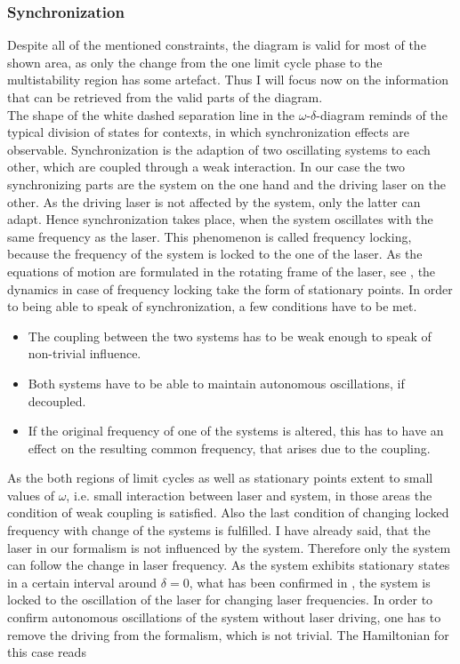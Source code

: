 \subsubsection{Synchronization}\label{sec:synchronization}
Despite all of the mentioned constraints, the diagram is valid for most of the shown area, as only the change from the one limit cycle phase to the multistability region has some artefact. Thus I will focus now on the information that can be retrieved from the valid parts of the diagram.\\%
The shape of the white dashed separation line in the $\omega$-$\delta$-diagram reminds of the typical division of states for contexts, in which synchronization effects are observable. Synchronization is the adaption of two oscillating systems to each other, which are coupled through a weak interaction. In our case the two synchronizing parts are the system on the one hand and the driving laser on the other. As the driving laser is not affected by the system, only the latter can adapt. Hence synchronization takes place, when the system oscillates with the same frequency as the laser. This phenomenon is called frequency locking, because the frequency of the system is locked to the one of the laser. As the equations of motion are formulated in the rotating frame of the laser, see , the dynamics in case of frequency locking take the form of stationary points. In order to being able to speak of synchronization, a few conditions have to be met\cite{synchronization}.
\begin{itemize}
    \item The coupling between the two systems has to be weak enough to speak of non-trivial influence.
    \item Both systems have to be able to maintain autonomous oscillations, if decoupled.
    \item If the original frequency of one of the systems is altered, this has to have an effect on the resulting common frequency, that arises due to the coupling.
\end{itemize}
As the both regions of limit cycles as well as stationary points extent to small values of $\omega$, i.e. small interaction between laser and system, in those areas the condition of weak coupling is satisfied. Also the last condition of changing locked frequency with change of the systems is fulfilled. I have already said, that the laser in our formalism is not influenced by the system. Therefore only the system can follow the change in laser frequency. As the system exhibits stationary states in a certain interval around $\delta=0$, what has been confirmed in , the system is locked to the oscillation of the laser for changing laser frequencies. In order to confirm autonomous oscillations of the system without laser driving, one has to remove the driving from the formalism, which is not trivial. The Hamiltonian for this case reads
